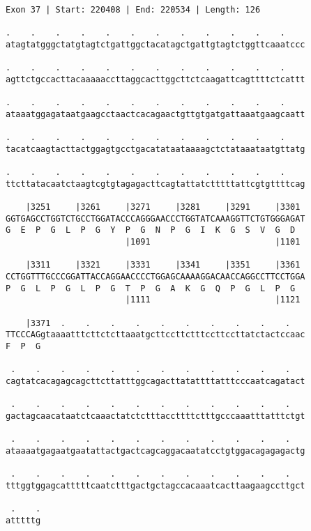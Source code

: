 \documentclass{article}
\begin{document}
\begin{Verbatim}[fontfamily=courier]
Exon 37 | Start: 220408 | End: 220534 | Length: 126

.    .    .    .    .    .    .    .    .    .    .    .    
atagtatgggctatgtagtctgattggctacatagctgattgtagtctggttcaaatccc

.    .    .    .    .    .    .    .    .    .    .    .    
agttctgccacttacaaaaaccttaggcacttggcttctcaagattcagttttctcattt

.    .    .    .    .    .    .    .    .    .    .    .    
ataaatggagataatgaagcctaactcacagaactgttgtgatgattaaatgaagcaatt

.    .    .    .    .    .    .    .    .    .    .    .    
tacatcaagtacttactggagtgcctgacatataataaaagctctataaataatgttatg

.    .    .    .    .    .    .    .    .    .    .    .    
ttcttatacaatctaagtcgtgtagagacttcagtattatctttttattcgtgttttcag

    |3251     |3261     |3271     |3281     |3291     |3301 
GGTGAGCCTGGTCTGCCTGGATACCCAGGGAACCCTGGTATCAAAGGTTCTGTGGGAGAT
G  E  P  G  L  P  G  Y  P  G  N  P  G  I  K  G  S  V  G  D  
                        |1091                         |1101 

    |3311     |3321     |3331     |3341     |3351     |3361 
CCTGGTTTGCCCGGATTACCAGGAACCCCTGGAGCAAAAGGACAACCAGGCCTTCCTGGA
P  G  L  P  G  L  P  G  T  P  G  A  K  G  Q  P  G  L  P  G  
                        |1111                         |1121 

    |3371  .    .    .    .    .    .    .    .    .    .   
TTCCCAGgtaaaatttcttctcttaaatgcttccttctttccttccttatctactccaac
F  P  G                                                     

 .    .    .    .    .    .    .    .    .    .    .    .   
cagtatcacagagcagcttcttatttggcagacttatattttatttcccaatcagatact

 .    .    .    .    .    .    .    .    .    .    .    .   
gactagcaacataatctcaaactatctctttaccttttctttgcccaaatttatttctgt

 .    .    .    .    .    .    .    .    .    .    .    .   
ataaaatgagaatgaatattactgactcagcaggacaatatcctgtggacagagagactg

 .    .    .    .    .    .    .    .    .    .    .    .   
tttggtggagcatttttcaatctttgactgctagccacaaatcacttaagaagccttgct

 .    .
atttttg
\end{Verbatim}
\newpage
\end{document}
